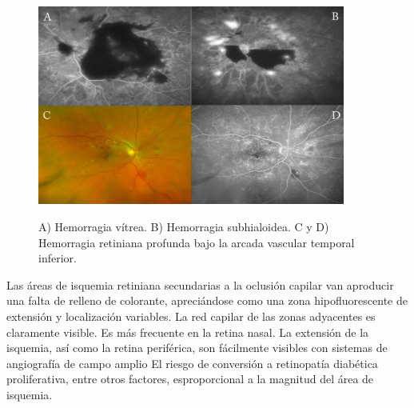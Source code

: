 \begin{figure}[H]
\centering
\includegraphics[width=0.9\textwidth]{./Figures/AF_HEMORRAGIA.png}
\label{fig:lightfilter}
\caption{ A) Hemorragia vítrea. B) Hemorragia subhialoidea. C y D) Hemorragia retiniana profunda bajo la arcada vascular temporal inferior.}
\end{figure}

Las áreas de isquemia retiniana secundarias a la oclusión capilar van aproducir una falta de relleno de colorante, apreciándose como una zona hipofluorescente de extensión y localización variables. La red capilar de las zonas adyacentes es claramente visible. Es más frecuente en la retina nasal. 
La extensión de la isquemia, así como la retina periférica, son fácilmente visibles con sistemas de angiografía de campo amplio  El riesgo de conversión a retinopatía diabética proliferativa, entre otros factores, esproporcional a la magnitud del área de isquemia.
 
 
 

